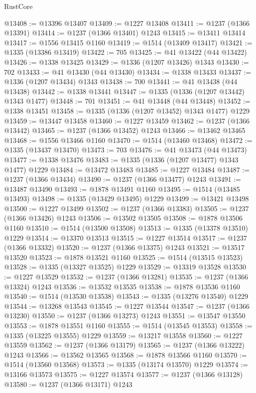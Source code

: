 \begin{lexlean}{RustCore}
\begin{coremodule}
@13408 := @13396 @13407
@13409 := @1227 @13408
@13411 := @1237 (@1366 @13391)
@13414 := @1237 (@1366 @13401) @1243
@13415 := @13411 @13414
@13417 := @1556 @13415 @1160
@13419 := @1514 (@13409 @13417)
@13421 := @1335 (@13386 @13419)
@13422 := 705
@13425 := @41 @13422 (@44 @13422)
@13426 := @1338 @13425
@13429 := @1336 (@1207 @13426) @1343
@13430 := 702
@13433 := @41 @13430 (@44 @13430)
@13434 := @1338 @13433
@13437 := @1336 (@1207 @13434) @1343
@13438 := 700
@13441 := @41 @13438 (@44 @13438)
@13442 := @1338 @13441
@13447 := @1335 (@1336 (@1207 @13442) @1343 @1477)
@13448 := 701
@13451 := @41 @13448 (@44 @13448)
@13452 := @1338 @13451
@13458 := @1335 (@1336 (@1207 @13452) @1343 @1477) @1229
@13459 := @13447 @13458
@13460 := @1227 @13459
@13462 := @1237 (@1366 @13442)
@13465 := @1237 (@1366 @13452) @1243
@13466 := @13462 @13465
@13468 := @1556 @13466 @1160
@13470 := @1514 (@13460 @13468)
@13472 := @1335 (@13437 @13470)
@13473 := 703
@13476 := @41 @13473 (@44 @13473)
@13477 := @1338 @13476
@13483 := @1335 (@1336 (@1207 @13477) @1343 @1477) @1229
@13484 := @13472 @13483
@13485 := @1227 @13484
@13487 := @1237 (@1366 @13434)
@13490 := @1237 (@1366 @13477) @1243
@13491 := @13487 @13490
@13493 := @1878 @13491 @1160
@13495 := @1514 (@13485 @13493)
@13498 := @1335 (@13429 @13495) @1229
@13499 := @13421 @13498
@13500 := @1227 @13499
@13502 := @1237 (@1366 @13383)
@13505 := @1237 (@1366 @13426) @1243
@13506 := @13502 @13505
@13508 := @1878 @13506 @1160
@13510 := @1514 (@13500 @13508)
@13513 := @1335 (@13378 @13510) @1229
@13514 := @13370 @13513
@13515 := @1227 @13514
@13517 := @1237 (@1366 @13332)
@13520 := @1237 (@1366 @13375) @1243
@13521 := @13517 @13520
@13523 := @1878 @13521 @1160
@13525 := @1514 (@13515 @13523)
@13528 := @1335 (@13327 @13525) @1229
@13529 := @13319 @13528
@13530 := @1227 @13529
@13532 := @1237 (@1366 @13281)
@13535 := @1237 (@1366 @13324) @1243
@13536 := @13532 @13535
@13538 := @1878 @13536 @1160
@13540 := @1514 (@13530 @13538)
@13543 := @1335 (@13276 @13540) @1229
@13544 := @13268 @13543
@13545 := @1227 @13544
@13547 := @1237 (@1366 @13230)
@13550 := @1237 (@1366 @13273) @1243
@13551 := @13547 @13550
@13553 := @1878 @13551 @1160
@13555 := @1514 (@13545 @13553)
@13558 := @1335 (@13225 @13555) @1229
@13559 := @13217 @13558
@13560 := @1227 @13559
@13562 := @1237 (@1366 @13179)
@13565 := @1237 (@1366 @13222) @1243
@13566 := @13562 @13565
@13568 := @1878 @13566 @1160
@13570 := @1514 (@13560 @13568)
@13573 := @1335 (@13174 @13570) @1229
@13574 := @13166 @13573
@13575 := @1227 @13574
@13577 := @1237 (@1366 @13128)
@13580 := @1237 (@1366 @13171) @1243

\end{coremodule}
\end{lexlean}

